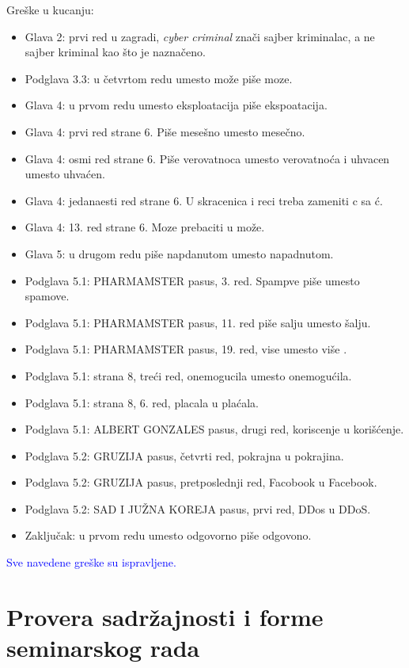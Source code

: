 \documentclass[a4paper]{report}
\newcommand{\odgovor}[1]{\textcolor{blue}{#1}}
\begin{document}
Greške u kucanju:
\begin{itemize}
\item Glava 2: prvi red u zagradi, \textit{cyber criminal} znači sajber kriminalac, a ne sajber kriminal kao što je naznačeno.
\item Podglava 3.3: u četvrtom redu umesto može piše moze.
\item Glava 4: u prvom redu umesto eksploatacija piše ekspoatacija.
\item Glava 4: prvi red strane 6. Piše mesešno umesto mesečno.
\item Glava 4: osmi red strane 6. Piše verovatnoca umesto verovatnoća i uhvacen umesto uhvaćen.
\item Glava 4: jedanaesti red strane 6. U skracenica i reci treba zameniti c sa ć.
\item Glava 4: 13. red strane 6. Moze prebaciti u može.
\item Glava 5: u drugom redu piše napdanutom umesto napadnutom.
\item Podglava 5.1: PHARMAMSTER pasus, 3. red. Spampve piše umesto spamove.
\item Podglava 5.1: PHARMAMSTER pasus, 11. red piše salju umesto šalju.
\item Podglava 5.1: PHARMAMSTER pasus, 19. red, vise umesto više .
\item Podglava 5.1: strana 8, treći red, onemogucila umesto onemogućila.
\item Podglava 5.1: strana 8, 6. red, placala u plaćala.
\item Podglava 5.1: ALBERT GONZALES pasus, drugi red, koriscenje u korišćenje.
\item Podglava 5.2: GRUZIJA pasus, četvrti red, pokrajna u pokrajina.
\item Podglava 5.2: GRUZIJA pasus, pretposlednji red, Facobook u Facebook.
\item Podglava 5.2: SAD I JUŽNA KOREJA pasus, prvi red, DDos u DDoS.
\item Zaključak: u prvom redu umesto odgovorno piše odgovono.
\end{itemize}

\odgovor{Sve navedene greške su ispravljene.}


\section{Provera sadržajnosti i forme seminarskog rada}
\end{document}
